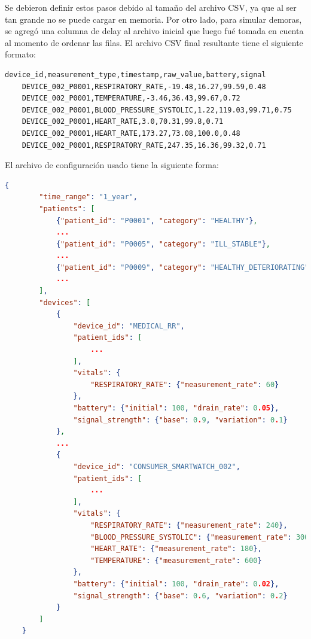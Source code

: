 Se debieron definir estos pasos debido al tamaño del archivo CSV, ya que al ser tan grande no se puede cargar en memoria.
Por otro lado, para simular demoras, se agregó una columna de delay al archivo inicial que luego fué tomada en cuenta al momento de ordenar las filas. 
El archivo CSV final resultante tiene el siguiente formato:
\begin{lstlisting}[language=CSV]
    device_id,measurement_type,timestamp,raw_value,battery,signal
    DEVICE_002_P0001,RESPIRATORY_RATE,-19.48,16.27,99.59,0.48
    DEVICE_002_P0001,TEMPERATURE,-3.46,36.43,99.67,0.72
    DEVICE_002_P0001,BLOOD_PRESSURE_SYSTOLIC,1.22,119.03,99.71,0.75
    DEVICE_002_P0001,HEART_RATE,3.0,70.31,99.8,0.71
    DEVICE_002_P0001,HEART_RATE,173.27,73.08,100.0,0.48
    DEVICE_002_P0001,RESPIRATORY_RATE,247.35,16.36,99.32,0.71
\end{lstlisting}

\newpage

El archivo de configuración usado tiene la siguiente forma: 

\begin{lstlisting}[language=JSON]
    {
        "time_range": "1_year",
        "patients": [
            {"patient_id": "P0001", "category": "HEALTHY"},
            ...
            {"patient_id": "P0005", "category": "ILL_STABLE"},
            ...
            {"patient_id": "P0009", "category": "HEALTHY_DETERIORATING"},
            ...
        ],
        "devices": [
            {
                "device_id": "MEDICAL_RR",
                "patient_ids": [
                    ...
                ],
                "vitals": {
                    "RESPIRATORY_RATE": {"measurement_rate": 60}
                },
                "battery": {"initial": 100, "drain_rate": 0.05},
                "signal_strength": {"base": 0.9, "variation": 0.1}
            },
            ...
            {
                "device_id": "CONSUMER_SMARTWATCH_002",
                "patient_ids": [
                    ...
                ],
                "vitals": {
                    "RESPIRATORY_RATE": {"measurement_rate": 240},
                    "BLOOD_PRESSURE_SYSTOLIC": {"measurement_rate": 300},
                    "HEART_RATE": {"measurement_rate": 180},
                    "TEMPERATURE": {"measurement_rate": 600}
                },
                "battery": {"initial": 100, "drain_rate": 0.02},
                "signal_strength": {"base": 0.6, "variation": 0.2}
            }
        ]
    }
\end{lstlisting}


